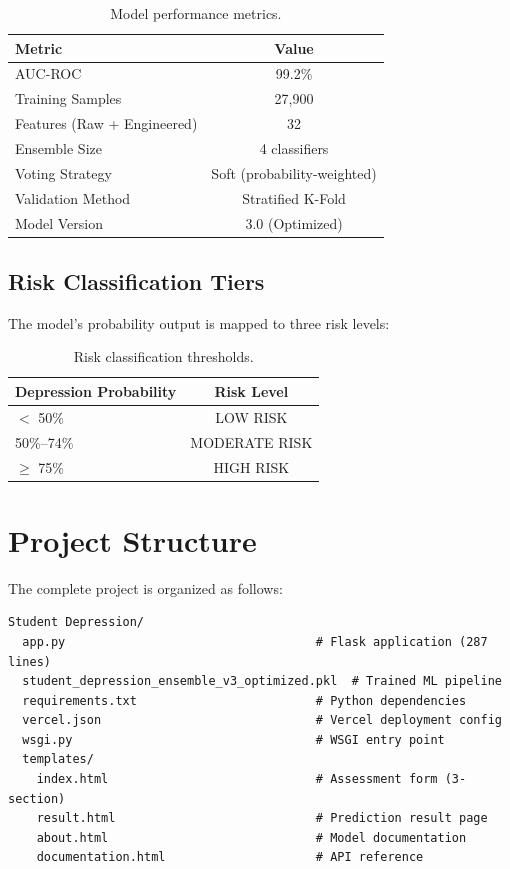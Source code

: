 \documentclass[11pt,a4paper]{article}
\begin{document}
\begin{table}[htbp]
\centering
\begin{tabular}{lc}
\toprule
\textbf{Metric} & \textbf{Value} \\
\midrule
AUC-ROC & 99.2\% \\
Training Samples & 27,900 \\
Features (Raw + Engineered) & 32 \\
Ensemble Size & 4 classifiers \\
Voting Strategy & Soft (probability-weighted) \\
Validation Method & Stratified K-Fold \\
Model Version & 3.0 (Optimized) \\
\bottomrule
\end{tabular}
\caption{Model performance metrics.}
\end{table}

\subsection{Risk Classification Tiers}

The model's probability output is mapped to three risk levels:

\begin{table}[htbp]
\centering
\begin{tabular}{lc}
\toprule
\textbf{Depression Probability} & \textbf{Risk Level} \\
\midrule
$<$ 50\% & LOW RISK \\
50\%--74\% & MODERATE RISK \\
$\ge$ 75\% & HIGH RISK \\
\bottomrule
\end{tabular}
\caption{Risk classification thresholds.}
\end{table}

\section{Project Structure}
\label{sec:structure}

The complete project is organized as follows:

\nopagebreak
\begin{lstlisting}[numbers=none,basicstyle=\ttfamily\footnotesize]
Student Depression/
  app.py                                   # Flask application (287 lines)
  student_depression_ensemble_v3_optimized.pkl  # Trained ML pipeline
  requirements.txt                         # Python dependencies
  vercel.json                              # Vercel deployment config
  wsgi.py                                  # WSGI entry point
  templates/
    index.html                             # Assessment form (3-section)
    result.html                            # Prediction result page
    about.html                             # Model documentation
    documentation.html                     # API reference
\end{lstlisting}
\end{document}
